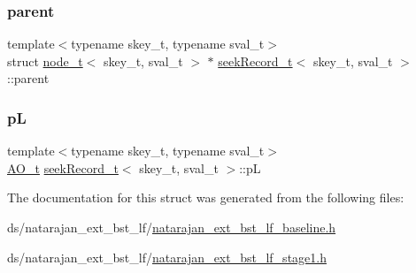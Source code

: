 \subsubsection{\texorpdfstring{parent}{parent}}
{\footnotesize\ttfamily template$<$typename skey\+\_\+t, typename sval\+\_\+t$>$ \\
struct \hyperlink{structnode__t}{node\+\_\+t}$<$ skey\+\_\+t, sval\+\_\+t $>$ $\ast$ \hyperlink{structseekRecord__t}{seek\+Record\+\_\+t}$<$ skey\+\_\+t, sval\+\_\+t $>$\+::parent}

\mbox{\label{structseekRecord__t_a9b2f8a0ea21818115cd1df8bd43e3805}} 
\subsubsection{\texorpdfstring{pL}{pL}}
{\footnotesize\ttfamily template$<$typename skey\+\_\+t, typename sval\+\_\+t$>$ \\
\hyperlink{atomic__ops_8h_a5225fef4d9eee821e82382cd269160dd}{A\+O\+\_\+t} \hyperlink{structseekRecord__t}{seek\+Record\+\_\+t}$<$ skey\+\_\+t, sval\+\_\+t $>$\+::pL}



The documentation for this struct was generated from the following files\+:\begin{DoxyCompactItemize}
\item 
ds/natarajan\+\_\+ext\+\_\+bst\+\_\+lf/\hyperlink{natarajan__ext__bst__lf__baseline_8h}{natarajan\+\_\+ext\+\_\+bst\+\_\+lf\+\_\+baseline.\+h}\item 
ds/natarajan\+\_\+ext\+\_\+bst\+\_\+lf/\hyperlink{natarajan__ext__bst__lf__stage1_8h}{natarajan\+\_\+ext\+\_\+bst\+\_\+lf\+\_\+stage1.\+h}\end{DoxyCompactItemize}
